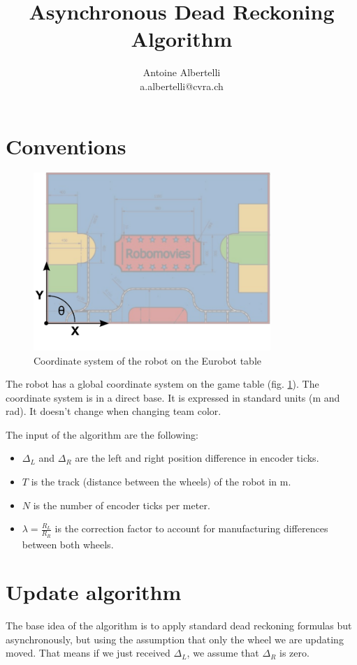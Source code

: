 \documentclass[a4paper]{IEEEtran}
\author{Antoine Albertelli\\{a.albertelli@cvra.ch}}
\title{Asynchronous Dead Reckoning Algorithm}
\begin{document}
\maketitle

\section{Conventions}
\begin{figure}[h]
    \begin{center}
        \includegraphics[width=0.8\textwidth]{table}
        \caption{Coordinate system of the robot on the Eurobot table}
        \label{fig:coordinates}
    \end{center}
\end{figure}

The robot has a global coordinate system on the game table (fig. \ref{fig:coordinates}).
The coordinate system is in a direct base.
It is expressed in standard units (\si{\meter} and \si{\radian}).
It doesn't change when changing team color.

The input of the algorithm are the following:
\begin{itemize}
    \item $\Delta_L$ and $\Delta_R$ are the left and right position difference in encoder ticks.
    \item $T$ is the track (distance between the wheels) of the robot in \si{\meter}.
    \item $N$ is the number of encoder ticks per meter.
    \item $\lambda = \frac{R_L}{R_R}$ is the correction factor to account for manufacturing differences between both wheels.
\end{itemize}

\section{Update algorithm}
The base idea of the algorithm is to apply standard dead reckoning formulas but asynchronously, but using the assumption that only the wheel we are updating moved.
That means if we just received $\Delta_L$, we assume that $\Delta_R$ is zero.
\end{document}
